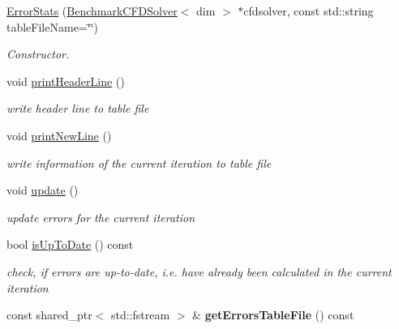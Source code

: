 \begin{DoxyCompactItemize}
\item 
\hyperlink{classnatrium_1_1ErrorStats_a911e70f932c75a80dad345b90e8b8c0d}{Error\-Stats} (\hyperlink{classnatrium_1_1BenchmarkCFDSolver}{Benchmark\-C\-F\-D\-Solver}$<$ dim $>$ $\ast$cfdsolver, const std\-::string table\-File\-Name=\char`\"{}\char`\"{})
\begin{DoxyCompactList}\small\item\em Constructor. \end{DoxyCompactList}\item 
\hypertarget{classnatrium_1_1ErrorStats_ad8cc77e4ac7a50e030e9a49fe1a5bdba}{void \hyperlink{classnatrium_1_1ErrorStats_ad8cc77e4ac7a50e030e9a49fe1a5bdba}{print\-Header\-Line} ()}\label{classnatrium_1_1ErrorStats_ad8cc77e4ac7a50e030e9a49fe1a5bdba}

\begin{DoxyCompactList}\small\item\em write header line to table file \end{DoxyCompactList}\item 
\hypertarget{classnatrium_1_1ErrorStats_af02f31d82efefb482ea4ab3d69642486}{void \hyperlink{classnatrium_1_1ErrorStats_af02f31d82efefb482ea4ab3d69642486}{print\-New\-Line} ()}\label{classnatrium_1_1ErrorStats_af02f31d82efefb482ea4ab3d69642486}

\begin{DoxyCompactList}\small\item\em write information of the current iteration to table file \end{DoxyCompactList}\item 
\hypertarget{classnatrium_1_1ErrorStats_ad24a8dae524127631e75368a0aac61b5}{void \hyperlink{classnatrium_1_1ErrorStats_ad24a8dae524127631e75368a0aac61b5}{update} ()}\label{classnatrium_1_1ErrorStats_ad24a8dae524127631e75368a0aac61b5}

\begin{DoxyCompactList}\small\item\em update errors for the current iteration \end{DoxyCompactList}\item 
\hypertarget{classnatrium_1_1ErrorStats_a72dcc0b8b86335a50ee1b324bbed0e61}{bool \hyperlink{classnatrium_1_1ErrorStats_a72dcc0b8b86335a50ee1b324bbed0e61}{is\-Up\-To\-Date} () const }\label{classnatrium_1_1ErrorStats_a72dcc0b8b86335a50ee1b324bbed0e61}

\begin{DoxyCompactList}\small\item\em check, if errors are up-\/to-\/date, i.\-e. have already been calculated in the current iteration \end{DoxyCompactList}\item 
\hypertarget{classnatrium_1_1ErrorStats_aebc5c3f92adfee93ece2f97275651e44}{const shared\-\_\-ptr$<$ std\-::fstream $>$ \& {\bfseries get\-Errors\-Table\-File} () const }\label{classnatrium_1_1ErrorStats_aebc5c3f92adfee93ece2f97275651e44}


\end{DoxyCompactItemize}
